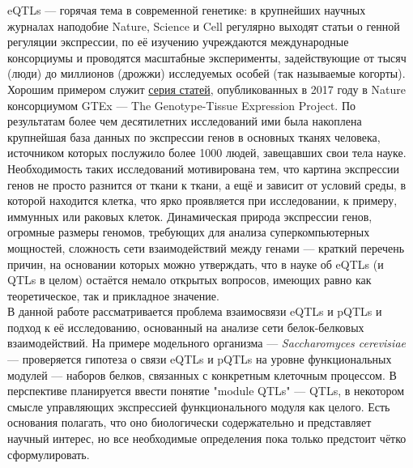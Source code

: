 \documentclass[11pt,a4paper]{report}
\theoremstyle{definition}
\theoremstyle{definition}
\theoremstyle{definition}
\begin{document}
	eQTLs — горячая тема в современной генетике: в крупнейших научных журналах наподобие Nature, Science и Cell регулярно выходят статьи о генной регуляции экспрессии, по её изучению учреждаются международные консорциумы и проводятся масштабные эксперименты, задействующие от тысяч (люди) до миллионов (дрожжи) исследуемых особей (так называемые когорты). Хорошим примером служит  \href{https://www.nature.com/articles/s41598-018-24219-z}{серия статей}, опубликованных в 2017 году в Nature консорциумом GTEx — The Genotype-Tissue Expression Project. По результатам более чем десятилетних исследований ими была накоплена крупнейшая база данных по экспрессии генов в основных тканях человека, источником которых послужило более 1000 людей, завещавших свои тела науке. Необходимость таких исследований мотивирована тем, что картина экспрессии генов не просто разнится от ткани к ткани, а ещё и зависит от условий среды, в которой находится клетка, что ярко проявляется при исследовании, к примеру, иммунных или раковых клеток. Динамическая природа экспрессии генов, огромные размеры геномов, требующих для анализа суперкомпьютерных мощностей, сложность сети взаимодействий между генами — краткий перечень причин, на основании которых можно утверждать, что в науке об eQTLs (и QTLs в целом) остаётся немало открытых вопросов, имеющих равно как теоретическое, так и прикладное значение.\\
	
	В данной работе рассматривается проблема взаимосвязи eQTLs и pQTLs и подход к её исследованию, основанный на анализе сети белок-белковых взаимодействий. На примере модельного организма — \textit{Saccharomyces cerevisiae} — проверяется гипотеза о связи eQTLs и pQTLs на уровне функциональных модулей — наборов белков, связанных с конкретным клеточным процессом. В перспективе планируется ввести понятие "module QTLs" — QTLs, в некотором смысле управляющих экспрессией функционального модуля как целого. Есть основания полагать, что оно биологически содержательно и представляет научный интерес, но все необходимые определения пока только предстоит чётко сформулировать.\\
	
\end{document}
